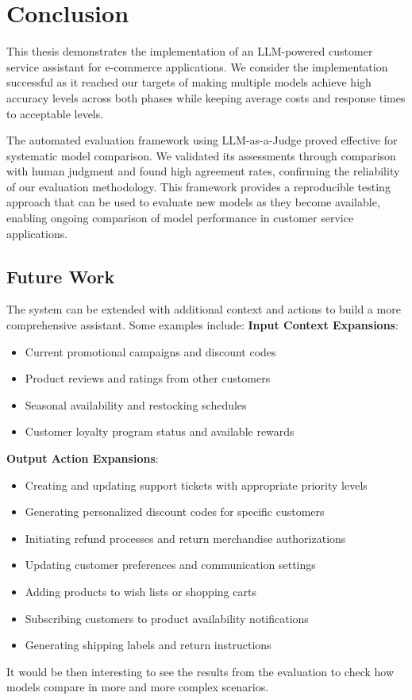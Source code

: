 \chapter{Conclusion}
\label{cha:conclusion}

This thesis demonstrates the implementation of an LLM-powered customer service assistant for e-commerce applications.
We consider the implementation successful as it reached our targets of making multiple models achieve high accuracy levels across both phases while keeping average costs and response times to acceptable levels.

The automated evaluation framework using LLM-as-a-Judge proved effective for systematic model comparison.
We validated its assessments through comparison with human judgment and found high agreement rates, confirming the reliability of our evaluation methodology.
This framework provides a reproducible testing approach that can be used to evaluate new models as they become available, enabling ongoing comparison of model performance in customer service applications.

\section{Future Work}

The system can be extended with additional context and actions to build a more comprehensive assistant.
Some examples include:
\newline
\textbf{Input Context Expansions}:
\begin{itemize}
    \item Current promotional campaigns and discount codes
    \item Product reviews and ratings from other customers
    \item Seasonal availability and restocking schedules
    \item Customer loyalty program status and available rewards
\end{itemize}
\textbf{Output Action Expansions}:
\begin{itemize}
    \item Creating and updating support tickets with appropriate priority levels
    \item Generating personalized discount codes for specific customers
    \item Initiating refund processes and return merchandise authorizations
    \item Updating customer preferences and communication settings
    \item Adding products to wish lists or shopping carts
    \item Subscribing customers to product availability notifications
    \item Generating shipping labels and return instructions
\end{itemize}
It would be then interesting to see the results from the evaluation to check how models compare in more and more complex scenarios.
